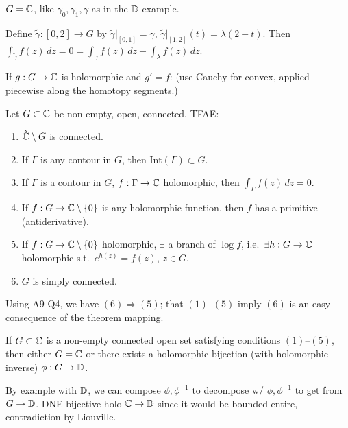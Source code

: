 \documentclass[11pt]{article}
\begin{document}
\begin{example}
$G={\mathbb{C}}$, like $\gamma_0,\gamma_1,\gamma$ as in the ${\mathbb{D}}$ example.
\end{example}

Define $\tilde\gamma:[0,2]\to G$ by $\tilde\gamma|_{[0,1]}=\gamma$, $\tilde\gamma|_{[1,2]}(t)=\lambda(2-t)$. Then $\int_{\tilde\gamma} f(z)\,dz=0 = \int_\gamma f(z)\,dz - \int_\lambda f(z)\,dz$.

If $g:G\to{\mathbb{C}}$ is holomorphic and $g'=f$: (use Cauchy for convex, applied piecewise along the homotopy segments.)

\begin{theorem}
Let $G\subset{\mathbb{C}}$ be non-empty, open, connected. TFAE:
\begin{enumerate}
    \item[(1)] $\hat{{\mathbb{C}}}\setminus G$ is connected.
    \item[(2)] If $\Gamma$ is any contour in $G$, then $\mathrm{Int}(\Gamma)\subset G$.
    \item[(3)] If $\Gamma$ is a contour in $G$, $f:\Gamma\to{\mathbb{C}}$ holomorphic, then $\int_\Gamma f(z)\,dz=0$.
    \item[(4)] If $f:G\to{\mathbb{C}}\setminus\{0\}$ is any holomorphic function, then $f$ has a primitive (antiderivative).
    \item[(5)] If $f:G\to{\mathbb{C}}\setminus\{0\}$ holomorphic, $\exists$ a branch of $\log f$, i.e.\ $\exists h:G\to{\mathbb{C}}$ holomorphic s.t.\ $e^{h(z)}=f(z)$, $z\in G$.
    \item[(6)] $G$ is simply connected.
\end{enumerate}
\end{theorem}

\begin{remark}
Using A9 Q4, we have $(6)\Rightarrow(5)$; that $(1)$--$(5)$ imply $(6)$ is an easy consequence of the theorem mapping.
\end{remark}

\begin{theorem}
If $G\subset{\mathbb{C}}$ is a non-empty connected open set satisfying conditions $(1)$--$(5)$, then either $G={\mathbb{C}}$ or there exists a holomorphic bijection (with holomorphic inverse) $\phi:G\to{\mathbb{D}}$.
\end{theorem}

\begin{exercise}
By example with ${\mathbb{D}}$, we can compose $\phi,\phi^{-1}$ to decompose w/ $\phi,\phi^{-1}$ to get from $G\to{\mathbb{D}}$. DNE bijective holo ${\mathbb{C}}\to{\mathbb{D}}$ since it would be bounded entire, contradiction by Liouville.
\end{exercise}
\end{document}
